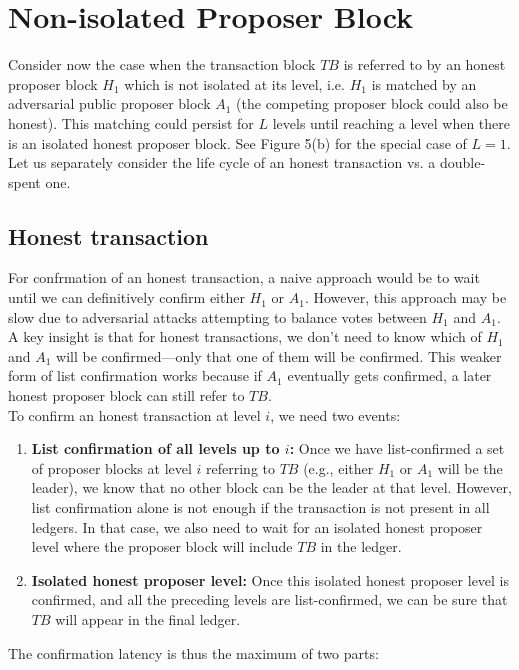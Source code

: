 \documentclass{report}
\begin{document}
\section{Non-isolated Proposer Block}
Consider now the case when the transaction block $TB$ is referred to by an honest proposer block $H_{1}$  which is not isolated at its level, i.e. $H_{1}$ is matched by an adversarial public proposer block $A_{1}$ (the competing proposer block could also be honest). This matching could persist for $L$ levels until reaching a level when there is an isolated honest proposer block. See Figure 5(b) for the special  case of $L = 1$. Let us separately consider the life cycle of an honest transaction vs. a double-spent one.
\subsection{Honest transaction}
For confrmation of an honest transaction, a naive approach would be to wait until we can definitively confirm either $H_{1}$ or $A_{1}$. However, this approach may be slow due to adversarial attacks attempting to balance votes between $H_{1}$ and $A_{1}$. A key insight is that for honest transactions, we don't need to know which of $H_{1}$ and $A_{1}$ will be confirmed—only that one of them will be confirmed. This weaker form of list confirmation works because if $A_{1}$ eventually gets confirmed, a later honest proposer block can still refer to $TB$.\\
To confirm an honest transaction at level $i$, we need two events:
\begin{enumerate}
	\item \textbf{List confirmation of all levels up to $i$:} Once we have list-confirmed a set of proposer blocks at level $i$ referring to $TB$ (e.g., either $H_{1}$ or $A_{1}$ will be the leader), we know that no other block can be the leader at that level. However, list confirmation alone is not enough if the transaction is not present in all ledgers. In that case, we also need to wait for an isolated honest proposer level where the proposer block will include $TB$ in the ledger.
	\item \textbf{Isolated honest proposer level:} Once this isolated honest proposer level is confirmed, and all the preceding levels are list-confirmed, we can be sure that $TB$ will appear in the final ledger.
\end{enumerate}
The confirmation latency is thus the maximum of two parts:\\
\end{document}
